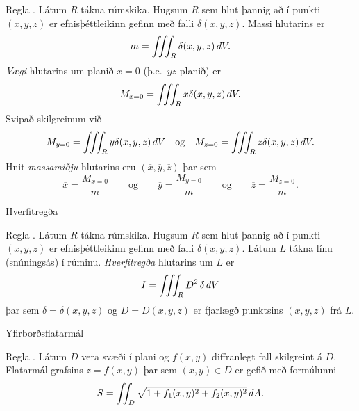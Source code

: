 \begin{frame}{} 

\begin {block}{Regla \kaflanr.}
 Látum $R$ tákna rúmskika.  Hugsum $R$ sem hlut þannig að í punkti $(x,y,z)$ er efnisþéttleikinn gefinn með falli $\delta(x,y,z)$.  Massi hlutarins er 
$$m=\int\!\!\!\int\!\!\!\int_R \delta(x,y,z)\,dV.$$
 {\em Vægi} hlutarins um planið $x=0$ (þ.e.~$yz$-planið) er
 $$M_{x=0}=\int\!\!\!\int\!\!\!\int_R x\delta(x,y,z)\,dV.$$
 Svipað skilgreinum við
 $$M_{y=0}=\thrint_R y\delta(x,y,z)\,dV 
 \quad \text{og}\quad
 M_{z=0}=\thrint_R z\delta(x,y,z)\,dV.$$
Hnit {\em massamiðju} hlutarins eru $(\overline{x}, \overline{y}, \overline{z})$ þar sem 
$$\overline{x}=\frac{M_{x=0}}{m}
\qquad\mbox{og}\qquad
\overline{y}=\frac{M_{y=0}}{m}
\qquad\mbox{og}\qquad
\overline{z}=\frac{M_{z=0}}{m}.$$
\end{block}

\end{frame}


\begin{frame}{Hverfitregða} 

\begin {block}{Regla \kaflanr.}
 Látum $R$ tákna rúmskika.  Hugsum $R$ sem hlut þannig að í punkti $(x,y,z)$ er efnisþéttleikinn gefinn með falli $\delta(x,y,z)$.  Látum $L$ tákna línu (snúningsás) í rúminu. {\em Hverfitregða} hlutarins um $L$ er
$$I=\int\!\!\!\int\!\!\!\int_R D^2 \,\delta\,dV$$
þar sem $\delta=\delta(x,y,z)$ og $D=D(x,y,z)$ er fjarlægð punktsins $(x,y,z)$ frá $L$.
\end{block}

\end{frame}


\begin{frame}{Yfirborðsflatarmál} 

\begin {block}{Regla \kaflanr.}
 Látum $D$ vera svæði í plani og $f(x,y)$ diffranlegt fall skilgreint á $D$.  Flatarmál grafsins $z=f(x,y)$ þar sem $(x,y)\in D$ er gefið með formúlunni
$$S=\int\!\!\!\int_D \sqrt{1+f_1(x,y)^2+f_2(x,y)^2}\,dA.$$

\end{block}

\end{frame}


